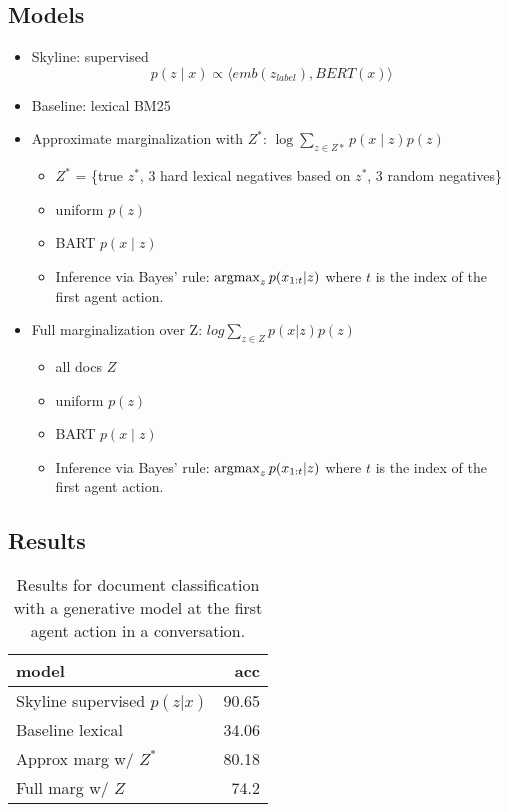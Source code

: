 \documentclass[11pt]{article}
\begin{document}
\subsection{Models}
\begin{itemize}
\item Skyline: supervised $$p(z \mid x) \propto \langle emb(z_{label}), BERT(x)\rangle$$
\item Baseline: lexical BM25
\item Approximate marginalization with $Z^*$: $\log\sum_{z\in Z*} p(x\mid z) p(z)$
    \begin{itemize}
    \item $Z^*$ = \{true $z^*$, 3 hard lexical negatives based on $z^*$, 3 random negatives\}
    \item uniform $p(z)$
    \item BART $p(x \mid z)$
    \item Inference via Bayes' rule: $\operatorname*{argmax}_z p(x_{1:t}|z)$ where $t$ is the index
        of the first agent action.
    \end{itemize}
\item Full marginalization over Z: $log\sum_{z\in Z} p(x|z)p(z)$
    \begin{itemize}
    \item all docs $Z$
    \item uniform $p(z)$
    \item BART $p(x \mid z)$
    \item Inference via Bayes' rule: $\operatorname*{argmax}_z p(x_{1:t}|z)$ where $t$ is the index
        of the first agent action.
    \end{itemize}
\end{itemize}

\subsection{Results}

\begin{table}
\centering
\begin{tabular}{lr}
\toprule
model & acc\\
\midrule
Skyline supervised $p(z|x)$ & 90.65\\
Baseline lexical & 34.06\\
Approx marg w/ $Z^*$ & 80.18\\
Full marg w/ $Z$ & 74.2\\
\bottomrule
\end{tabular}
\caption{
\label{tbl:unsup-doc-app}
Results for document classification with a generative model at the first
agent action in a conversation.}
\end{table}
\end{document}
